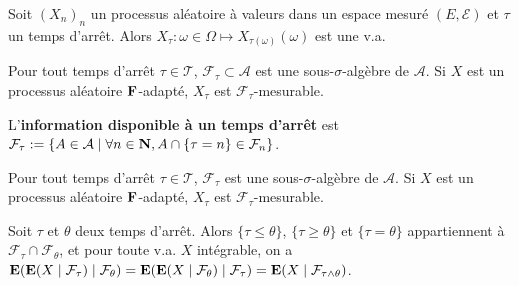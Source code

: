 \begin{pop}
	Soit $(X_n)_n$ un processus aléatoire à valeurs dans un espace mesuré $(E,\mathcal{E})$ et $\tau$ un temps d'arrêt.
	Alors $X_\tau \colon \omega \in \Omega \mapsto X_{\tau(\omega)}(\omega)$ est une v.a.
\end{pop}

\begin{pop}
	Pour tout temps d'arrêt $\tau \in \mathcal{T}$, $\mathcal{F}_\tau \subset \mathcal{A}$ est une sous-$\sigma$-algèbre de $\mathcal{A}$.
	Si $X$ est un processus aléatoire $\mathbf{F}$-adapté, $X_\tau$ est $\mathcal{F}_\tau$-mesurable.
\end{pop}

\begin{defn}
	L'\textbf{information disponible à un temps d'arrêt} est $\mathcal{F}_\tau := \{ A \in \mathcal{A} \mid \forall n \in \mathbf{N}, A \cap \{ \tau = n \} \in \mathcal{F}_n \}$.
\end{defn}

\begin{pop}
	Pour tout temps d'arrêt $\tau \in \mathcal{T}$, $\mathcal{F}_\tau$ est une sous-$\sigma$-algèbre de $\mathcal{A}$.
	Si $X$ est un processus aléatoire $\mathbf{F}$-adapté, $X_\tau$ est $\mathcal{F}_\tau$-mesurable.
\end{pop}

\begin{pop}
	Soit $\tau$ et $\theta$ deux temps d'arrêt.
	Alors $\{ \tau \leq \theta \}$, $\{ \tau \geq \theta \}$ et $\{ \tau = \theta \}$ appartiennent à $\mathcal{F}_\tau \cap \mathcal{F}_\theta$, et pour toute v.a. $X$ intégrable, on a $\mathbf{E}(\mathbf{E}(X \mid \mathcal{F}_\tau) \mid \mathcal{F}_\theta) = \mathbf{E}(\mathbf{E}(X \mid \mathcal{F}_\theta) \mid \mathcal{F}_\tau) = \mathbf{E}(X \mid \mathcal{F}_{\tau \wedge \theta})$.
\end{pop}
